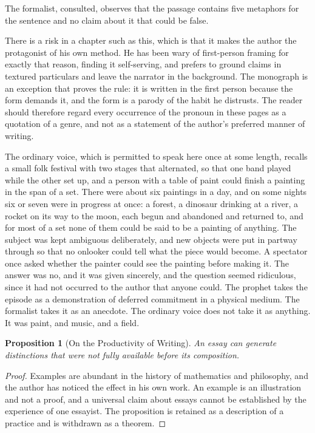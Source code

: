 \documentclass[11pt,openany,twoside]{book}
\theoremstyle{plain}
\newtheorem{proposition}{Proposition}[chapter]
\theoremstyle{definition}
\theoremstyle{remark}
\begin{document}
The formalist, consulted, observes that the passage contains five metaphors for the sentence and no claim about it that could be false.

There is a risk in a chapter such as this, which is that it makes the author the protagonist of his own method. He has been wary of first-person framing for exactly that reason, finding it self-serving, and prefers to ground claims in textured particulars and leave the narrator in the background. The monograph is an exception that proves the rule: it is written in the first person because the form demands it, and the form is a parody of the habit he distrusts. The reader should therefore regard every occurrence of the pronoun in these pages as a quotation of a genre, and not as a statement of the author's preferred manner of writing.

The ordinary voice, which is permitted to speak here once at some length, recalls a small folk festival with two stages that alternated, so that one band played while the other set up, and a person with a table of paint could finish a painting in the span of a set. There were about six paintings in a day, and on some nights six or seven were in progress at once: a forest, a dinosaur drinking at a river, a rocket on its way to the moon, each begun and abandoned and returned to, and for most of a set none of them could be said to be a painting of anything. The subject was kept ambiguous deliberately, and new objects were put in partway through so that no onlooker could tell what the piece would become. A spectator once asked whether the painter could see the painting before making it. The answer was no, and it was given sincerely, and the question seemed ridiculous, since it had not occurred to the author that anyone could. The prophet takes the episode as a demonstration of deferred commitment in a physical medium. The formalist takes it as an anecdote. The ordinary voice does not take it as anything. It was paint, and music, and a field.

\begin{proposition}[On the Productivity of Writing]\label{prop:writing}
An essay can generate distinctions that were not fully available before its composition.
\end{proposition}

\begin{proof}
Examples are abundant in the history of mathematics and philosophy, and the author has noticed the effect in his own work. An example is an illustration and not a proof, and a universal claim about essays cannot be established by the experience of one essayist. The proposition is retained as a description of a practice and is withdrawn as a theorem.
\end{proof}
\end{document}
